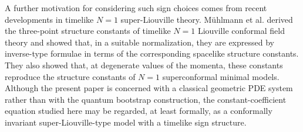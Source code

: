 \documentclass[a4paper, 12pt]{article}
\begin{document}
	A further motivation for considering such sign choices comes from recent developments in timelike \(N=1\) super-Liouville theory. M\"uhlmann et al. \cite{muhlmann2026three} derived the three-point structure constants of timelike \(N=1\) Liouville conformal field theory and showed that, in a suitable normalization, they are expressed by inverse-type formulae in terms of the corresponding spacelike structure constants. They also showed that, at degenerate values of the momenta, these constants reproduce the structure constants of \(N=1\) superconformal minimal models. Although the present paper is concerned with a classical geometric PDE system rather than with the quantum bootstrap construction, the constant-coefficient equation studied here may be regarded, at least formally, as a conformally invariant super-Liouville-type model with a timelike sign structure.
	
\end{document}
